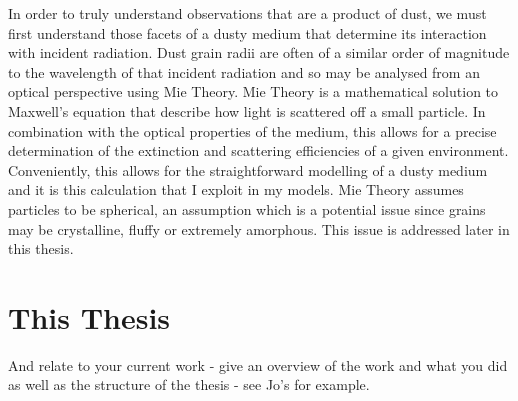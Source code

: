 In order to truly understand observations that are a product of dust, we must first understand those facets of a dusty medium that determine its interaction with incident radiation.  Dust grain radii are often of a similar order of magnitude to the wavelength of that incident radiation and so may be analysed from an optical perspective using Mie Theory.  Mie Theory is a mathematical solution to Maxwell's equation that describe how light is scattered off a small particle.  In combination with the optical properties of the medium, this allows for a precise determination of the extinction and scattering efficiencies of a given environment.  Conveniently, this allows for the straightforward modelling of a dusty medium and it is this calculation that I exploit in my models.  Mie Theory assumes particles to be spherical, an assumption which is a potential issue since grains may be crystalline, fluffy or extremely amorphous.  This issue is addressed later in this thesis.



\section{This Thesis}
And relate to your current work - give an overview of the work and what you did as well as the structure of the thesis - see Jo's for example.
